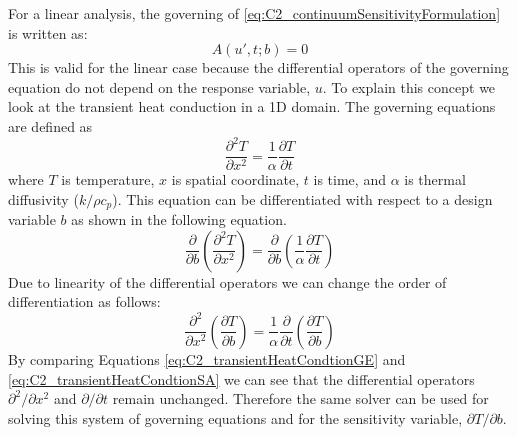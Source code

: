 For a linear analysis, the governing  of \eqref{eq:C2_continuumSensitivityFormulation} is written as:
%
\begin{equation}\label{eq:C2_linearSAgoverningEquation}
    A(u', t; b) = 0 
\end{equation}
%
This is valid for the linear case because the differential operators of the governing equation do not depend on the response variable, $u$. To explain this concept we look at the transient heat conduction in a 1D domain. The governing equations are defined as
%
\begin{equation}\label{eq:C2_transientHeatCondtionGE}
    \frac{\partial^2 T}{\partial x^2} = \frac{1}{\alpha} \frac{\partial T}{\partial t}
\end{equation}
%
where $T$ is temperature, $x$ is spatial coordinate, $t$ is time, and $\alpha$ is thermal diffusivity ($k/\rho c_p$). This equation can be differentiated with respect to a design variable $b$ as shown in the following equation.
%
\begin{equation*}
    \frac{\partial}{\partial b}
    \left( \frac{\partial^2 T}{\partial x^2}\right) = 
    \frac{\partial}{\partial b}
    \left( \frac{1}{\alpha} \frac{\partial T}{\partial t}\right)
\end{equation*}
%
Due to linearity of the differential operators we can change the order of differentiation as follows:
%
\begin{equation}\label{eq:C2_transientHeatCondtionSA}
    \frac{\partial^2}{\partial x^2}
    \left( \frac{\partial T}{\partial b} \right) = 
    \frac{1}{\alpha} \frac{\partial}{\partial t}
    \left( \frac{\partial T}{\partial b}\right)
\end{equation}
%
By comparing Equations \eqref{eq:C2_transientHeatCondtionGE} and \eqref{eq:C2_transientHeatCondtionSA} we can see that the differential operators $\partial^2 /\partial x^2$ and $\partial /\partial t$ remain unchanged. Therefore the same solver can be used for solving this system of governing equations and for the sensitivity variable, $\partial T/\partial b$.

